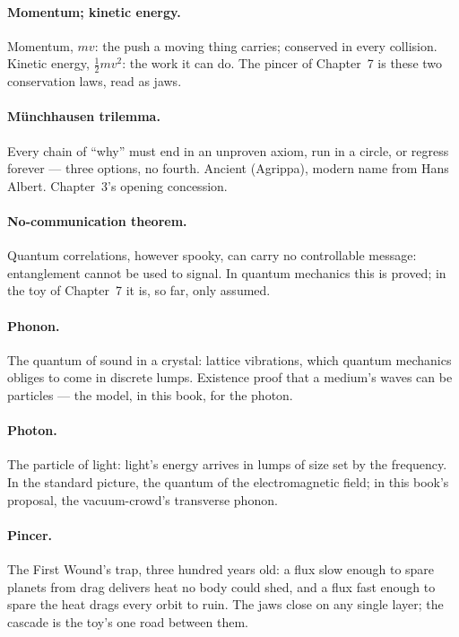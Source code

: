 \documentclass[fontsize=11pt,paper=a4,pagesize=auto,parskip=half-]{scrbook}
\begin{document}
\paragraph{Momentum; kinetic energy.} Momentum, $mv$: the push a moving thing carries; conserved in every collision. Kinetic energy, $\tfrac{1}{2}mv^{2}$: the work it can do. The pincer of Chapter~7 is these two conservation laws, read as jaws.

\paragraph{M\"unchhausen trilemma.} Every chain of ``why'' must end in an unproven axiom, run in a circle, or regress forever --- three options, no fourth. Ancient (Agrippa), modern name from Hans Albert. Chapter~3's opening concession.

\paragraph{No-communication theorem.} Quantum correlations, however spooky, can carry no controllable message: entanglement cannot be used to signal. In quantum mechanics this is proved; in the toy of Chapter~7 it is, so far, only assumed.

\paragraph{Phonon.} The quantum of sound in a crystal: lattice vibrations, which quantum mechanics obliges to come in discrete lumps. Existence proof that a medium's waves can be particles --- the model, in this book, for the photon.

\paragraph{Photon.} The particle of light: light's energy arrives in lumps of size set by the frequency. In the standard picture, the quantum of the electromagnetic field; in this book's proposal, the vacuum-crowd's transverse phonon.

\paragraph{Pincer.} The First Wound's trap, three hundred years old: a flux slow enough to spare planets from drag delivers heat no body could shed, and a flux fast enough to spare the heat drags every orbit to ruin. The jaws close on any single layer; the cascade is the toy's one road between them.
\end{document}
